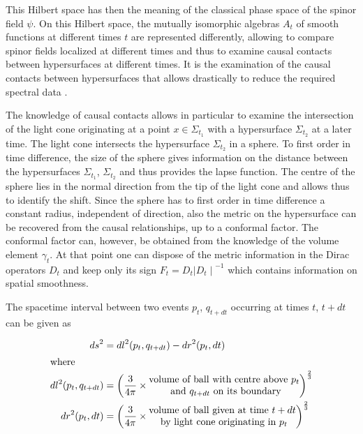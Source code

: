 \documentclass[a4paper,10pt,oneside]{amsart}
\theoremstyle{plain}
\theoremstyle{definition}
\theoremstyle{remark}
\begin{document}
This Hilbert space has then the meaning of the classical phase
space of the spinor field $\psi$. On this Hilbert space, the
mutually isomorphic algebras ${A}_{t}$ of smooth functions at
different times $t$ are represented differently, allowing to
compare spinor fields localized at different times and thus to
examine causal contacts between hypersurfaces at different times.
It is the examination of the causal contacts between hypersurfaces
that allows drastically to reduce the required spectral data
\cite{Kopf98}.


The knowledge of causal contacts allows in particular to
examine the intersection of the light cone originating at a point
$x\in {\Sigma}_{{t}_{1}}$ with a hypersurface ${\Sigma}_{{t}_{2}}$
at a later time. The light cone intersects the hypersurface
${\Sigma}_{{t}_{2}}$ in a sphere. To first order in time
difference, the size of the sphere gives information on the
distance between the hypersurfaces ${\Sigma}_{{t}_{1}}$,
${\Sigma}_{{t}_{2}}$ and thus provides the lapse function. The
centre of the sphere lies in the normal direction from the tip of
the light cone and allows thus to identify the shift. Since the
sphere has to first order in time difference a constant radius,
independent of direction, also the metric on the hypersurface can
be recovered from the causal relationships, up to a conformal
factor. The conformal factor can, however, be obtained from the
knowledge of the volume element ${\gamma}_{t}$.  At that point
one can dispose of the metric information in the Dirac operators
${D}_{t}$ and keep only its sign ${F}_{t} = {D}_{t}{\mid
{D}_{t}\mid }^{-1}$ which contains information on spatial
smoothness.



The spacetime interval between two events ${p}_{t}$, ${q}_{t+dt}$
occurring at times $t$, $t+dt$ can be given as



\begin{align}\label{stinterval}
  {ds}^{2} &= {dl}^{2}({p}_{t}, {q}_{t+dt})-{dr}^{2}({p}_{t},dt)  \\
  \intertext{where}
{dl}^{2}({p}_{t}, {q}_{t+dt}) &= {\left(\frac {3} {4\pi}\times
\begin{matrix}\text{volume of ball with centre above ${p}_{t}$}\\
 \text{ and ${q}_{t+dt}$ on its boundary}\end{matrix} \right)}^{\frac
{2}{3}}\\ {dr}^{2}({p}_{t},dt) &= {\left(\frac {3}
{4\pi}\times\begin{matrix}\text{volume of ball given at time
$t+dt$}\\ \text{ by light cone originating in
${p}_{t}$}\end{matrix} \right)}^{\frac {2}{3}}
\end{align}
\end{document}
